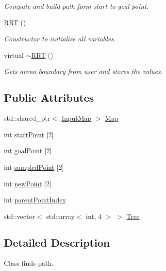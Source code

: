 \begin{DoxyCompactItemize}
\begin{DoxyCompactList}\small\item\em Compute and build path form start to goal point. \end{DoxyCompactList}\item 
\hyperlink{classRRT_a0a7bb3a3af2d70c656764fbe8f6ae671}{R\+RT} ()
\begin{DoxyCompactList}\small\item\em Constructor to initialize all variables. \end{DoxyCompactList}\item 
virtual \hyperlink{classRRT_ab16d13c231d664dddaf41f904d5770f8}{$\sim$\+R\+RT} ()
\begin{DoxyCompactList}\small\item\em Gets arena boundary from user and stores the values. \end{DoxyCompactList}\end{DoxyCompactItemize}
\subsection*{Public Attributes}
\begin{DoxyCompactItemize}
\item 
std\+::shared\+\_\+ptr$<$ \hyperlink{classInputMap}{Input\+Map} $>$ \hyperlink{classRRT_a072ade92010a498a1a5158fcef0d9ee9}{Map}
\item 
int \hyperlink{classRRT_a85de597c47f635ac1804a7e2c98f717b}{start\+Point} \mbox{[}2\mbox{]}
\item 
int \hyperlink{classRRT_acdc27db3967b542df1ebab8da270bd72}{goal\+Point} \mbox{[}2\mbox{]}
\item 
int \hyperlink{classRRT_a319220aada572c19cbbd2cfe0eb99c6d}{sampled\+Point} \mbox{[}2\mbox{]}
\item 
int \hyperlink{classRRT_a86bebb284bab72fab29824d75f5cb5a1}{new\+Point} \mbox{[}2\mbox{]}
\item 
int \hyperlink{classRRT_a93596f78ae0f49d4f54c61ec5b50c2f8}{parent\+Point\+Index}
\item 
std\+::vector$<$ std\+::array$<$ int, 4 $>$ $>$ \hyperlink{classRRT_a6ac6f3ad0727baaa8a17a2ee64e5bd2b}{Tree}
\end{DoxyCompactItemize}


\subsection{Detailed Description}
Class finds path. 

